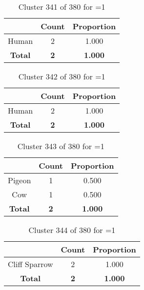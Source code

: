 \begin{table}[ht!]
\centering
\begin{tabular}{|c|c|c|}
\hline
\bf \Spec{} &\bf Count &\bf Proportion\\ \hline \hline
Human & 2 & 1.000\\ \hline
\hline
\bf Total & \bf 2 & \bf 1.000\\ \hline
\end{tabular}
\label{tab:cluster:341:1}
\caption{Cluster 341 of 380 for \minneigh{}=1}
\end{table}

\begin{table}[ht!]
\centering
\begin{tabular}{|c|c|c|}
\hline
\bf \Spec{} &\bf Count &\bf Proportion\\ \hline \hline
Human & 2 & 1.000\\ \hline
\hline
\bf Total & \bf 2 & \bf 1.000\\ \hline
\end{tabular}
\label{tab:cluster:342:1}
\caption{Cluster 342 of 380 for \minneigh{}=1}
\end{table}

\begin{table}[ht!]
\centering
\begin{tabular}{|c|c|c|}
\hline
\bf \Spec{} &\bf Count &\bf Proportion\\ \hline \hline
Pigeon & 1 & 0.500\\ \hline
Cow & 1 & 0.500\\ \hline
\hline
\bf Total & \bf 2 & \bf 1.000\\ \hline
\end{tabular}
\label{tab:cluster:343:1}
\caption{Cluster 343 of 380 for \minneigh{}=1}
\end{table}

\begin{table}[ht!]
\centering
\begin{tabular}{|c|c|c|}
\hline
\bf \Spec{} &\bf Count &\bf Proportion\\ \hline \hline
Cliff Sparrow & 2 & 1.000\\ \hline
\hline
\bf Total & \bf 2 & \bf 1.000\\ \hline
\end{tabular}
\label{tab:cluster:344:1}
\caption{Cluster 344 of 380 for \minneigh{}=1}
\end{table}

